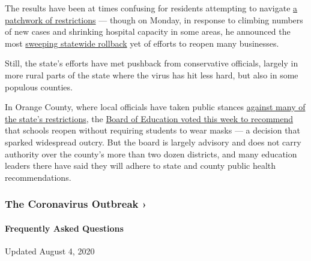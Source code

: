 The results have been at times confusing for residents attempting to
navigate
\href{https://www.nytimes3xbfgragh.onion/article/coronavirus-california-reopening-phases.html}{a
patchwork of restrictions} --- though on Monday, in response to climbing
numbers of new cases and shrinking hospital capacity in some areas, he
announced the most
\href{https://www.nytimes3xbfgragh.onion/2020/07/14/us/california-counties-reopening.html}{sweeping
statewide rollback} yet of efforts to reopen many businesses.

Still, the state's efforts have met pushback from conservative
officials, largely in more rural parts of the state where the virus has
hit less hard, but also in some populous counties.

In Orange County, where local officials have taken public stances
\href{https://www.nytimes3xbfgragh.onion/aponline/2020/07/14/us/ap-us-virus-outbreak-school-politics.html}{against
many of the state's restrictions}, the
\href{https://www.ocregister.com/2020/07/15/wagner-chau-back-away-from-controversial-school-board-recommendation/}{Board
of Education voted this week to recommend} that schools reopen without
requiring students to wear masks --- a decision that sparked widespread
outcry. But the board is largely advisory and does not carry authority
over the county's more than two dozen districts, and many education
leaders there have said they will adhere to state and county public
health recommendations.

\href{https://www.nytimes3xbfgragh.onion/news-event/coronavirus?action=click\&pgtype=Article\&state=default\&region=MAIN_CONTENT_3\&context=storylines_faq}{}

\hypertarget{the-coronavirus-outbreak-}{%
\subsubsection{The Coronavirus Outbreak
›}\label{the-coronavirus-outbreak-}}

\hypertarget{frequently-asked-questions}{%
\paragraph{Frequently Asked
Questions}\label{frequently-asked-questions}}

Updated August 4, 2020

